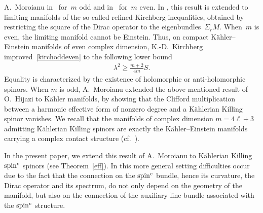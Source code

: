 \documentclass[10pt,a4paper]{amsart}
\numberwithin{equation}{section}
\theoremstyle{definition}
\begin{document}
A.~Moroianu in~\cite{am_odd} for~$m$ odd and in~\cite{am_even} for~$m$ even. In \cite{pilcapaper}, this result is extended to limiting manifolds of the so-called ref\/ined Kirchberg inequalities, obtained by restricting the square of the Dirac operator to the eigenbundles~$\Sigma_r M$. When~$m$ is even, the limiting manifold cannot be Einstein. Thus,  on compact K\"ahler--Einstein manifolds of even complex dimension, K.-D.~Kirchberg~\cite{kircheven} impro\-ved~\eqref{kirchoddeven}  to the following lower bound
\begin{gather}\label{kirchke}
\lambda^2 \geq \frac{m+2}{4m} S.
\end{gather}
Equality is characterized by the existence of holomorphic or anti-holomorphic spinors.
When $m$ is odd, A.~Moroianu extended the above mentioned result of O.~Hijazi to K\"ahler manifolds, by showing that
the Clif\/ford multiplication between a harmonic  ef\/fective form of nonzero degree and a K\"ahlerian Killing spinor vanishes.
We recall that the manifolds  of complex dimension $m =4\ell+3$ admitting K\"ahlerian Killing spinors are exactly
the K\"ahler--Einstein manifolds carrying a complex contact structure (cf.~\cite{ks, am_odd, ms}).

In the present paper, we extend this result of A.~Moroianu to K\"ahlerian Killing ${\mathop{\rm spin}^c}$ spinors (see Theorem~\ref{eff}). In this more general setting dif\/f\/iculties occur due to the fact that the connection on the ${\mathop{\rm spin}^c}$ bundle, hence its curvature, the Dirac operator and its spectrum,  do not only depend on the geometry of the manifold, but also on the connection
of the auxiliary line bundle associated with the ${\mathop{\rm spin}^c}$ structure.
\end{document}
